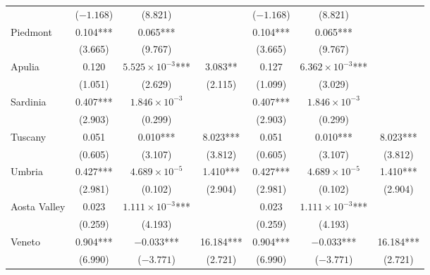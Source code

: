 \documentclass[12pt]{article}
\begin{document}
\begin{appendices}
\begin{longtable}{@{}lcccccc@{}}
             & ($-1.168$) & (8.821) &  & ($-1.168$) & (8.821) &    \\ 
            Piedmont & 0.104*** & 0.065*** &  & 0.104*** & 0.065*** &  \\ 
             & (3.665) & (9.767) &  & (3.665) & (9.767) &  \\ 
            Apulia & 0.120 & $5.525 \times 10^{-3}$*** & 3.083** & 0.127 & $6.362 \times 10^{-3}$*** &  \\ 
             & (1.051) & (2.629) & (2.115) & (1.099) & (3.029) &  \\ 
            Sardinia & 0.407*** & $1.846 \times 10^{-3}$ &  & 0.407*** & $1.846 \times 10^{-3}$ &  \\ 
             & (2.903) & (0.299) &  & (2.903) & (0.299) &  \\ 
            Tuscany & 0.051 & 0.010*** & 8.023*** & 0.051 & 0.010*** & 8.023*** \\ 
             & (0.605) & (3.107) & (3.812) & (0.605) & (3.107) & (3.812) \\ 
            Umbria & 0.427*** & $4.689 \times 10^{-5}$ & 1.410*** & 0.427*** & $4.689 \times 10^{-5}$ & 1.410*** \\ 
             & (2.981) & (0.102) & (2.904) & (2.981) & (0.102) & (2.904) \\ 
            Aosta Valley & 0.023 & $1.111 \times 10^{-3}$*** &  & 0.023 & $1.111 \times 10^{-3}$*** &  \\ 
             & (0.259) & (4.193) &  & (0.259) & (4.193) &  \\ 
            Veneto & 0.904*** & $-0.033$*** & 16.184*** & 0.904*** & $-0.033$*** & 16.184*** \\
             & (6.990) & ($-3.771$) & (2.721) & (6.990) & ($-3.771$) & (2.721) \\* \bottomrule
    	\end{longtable}
		

\end{appendices}
\end{document}
